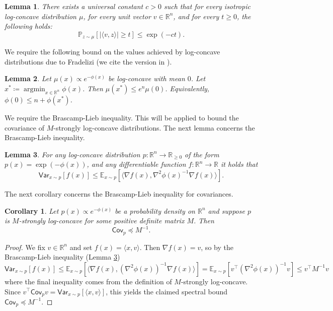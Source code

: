 \documentclass[11pt]{article}
\DeclareMathOperator*{\argmin}{argmin}
\numberwithin{equation}{section}
\newtheorem{lemma}{Lemma}[section]
\newtheorem{corollary}[corollary]{Corollary}
\theoremstyle{definition}
\newcommand{\g}{\nabla}
\newcommand{\R}{\mathbb{R}}
\renewcommand{\l}{\langle}
\renewcommand{\r}{\rangle}
\newcommand{\E}[2]{\mathbb{E}_{#1}\left[#2\right]}
\renewcommand{\P}[2]{\mathbb{P}_{#1}\left[#2\right]}
\newcommand{\V}[2]{\mathsf{Var}_{#1}\left[#2\right]}
\newcommand{\C}{\mathsf{Cov}}
\newcommand{\pe}{\preceq}
\begin{document}
\begin{lemma}\label{prelim:lem:lg_subtails}
There exists a universal constant $c>0$ such that for every isotropic
log-concave distribution
$\mu$, for every unit vector
$v \in \R^n$, and for every
$t \ge 0$, the following holds:
    \[
\P{z \sim \mu}{|\langle v, z \rangle|\geq t} \leq \exp(-ct).
\]
\end{lemma}

We require the following bound on the values achieved by log-concave
distributions due to Fradelizi (we cite the version in \cite[Theorem
3.3]{P12:journal}).
\begin{lemma}
\label{lemma:frad}
Let $\mu(x) \propto e^{-\phi(x)}$ be log-concave with mean
$0$.
Let $x^* \coloneq \argmin_{x \in \R^n} \phi(x)$.
Then $\mu(x^*) \le e^n \mu(0)$.
Equivalently, $\phi(0) \le n + \phi(x^*)$.
\end{lemma}

We require the Brascamp-Lieb inequality.
This will be applied to bound the covariance of $M$-strongly log-concave
distributions.
The next lemma concerns the Brascamp-Lieb inequality.

\begin{lemma}\label{lem:brascamp_lieb}
For any log-concave distribution $p: \R^{n} \rightarrow \R_{\ge0}$ of the form
$p(x) = \exp(-\phi(x))$, and any differentiable function
$f: \R^{n} \rightarrow \R$ it holds that
\[
\V{x \sim p}{f(x)} \le \E{x \sim p}{\l \g f(x), \g^2 \phi(x)^{-1} \g f(x) \r}.
\]
\end{lemma}

The next corollary concerns the Brascamp-Lieb inequality for covariances.

\begin{corollary}
\label{cor:brascamp_lieb_cov}
Let $p(x)\propto e^{-\phi(x)}$ be a probability density on
$\mathbb{R}^n$ and suppose
$p$ is
$M$-strongly log-concave for some positive definite matrix
$M$.
Then
\[
\C_p \pe M^{-1}.
\]
\end{corollary}
\begin{proof}

We fix $v \in \R^n$ and set
$f(x)=\langle x,v\rangle$.
Then $\nabla f(x) = v$, so by the Brascamp-Lieb inequality (Lemma
\ref{lem:brascamp_lieb})
\[
\V{x \sim p}{f(x)}
\leq \E{x \sim p}{\langle \nabla f(x),(\nabla^2\phi(x))^{-1}\nabla f(x)\rangle}
= \E{x\sim p}{v^\top(\nabla^2\phi(x))^{-1} v}
\leq v^\top M^{-1} v
\]
where the final inequality comes from the definition of $M$-strongly
log-concave.
Since \(v^\top \C_p v=\V{x\sim p}{\langle x,v\rangle}\), this yields the claimed
spectral bound $\C_p \pe M^{-1}$.
\end{proof}
\end{document}
